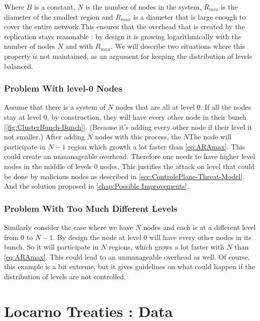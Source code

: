 \documentclass[a4paper,11pt,oneside]{report}
\begin{document}
Where $B$ is a constant, $N$ is the number of nodes in the system, $R_{min}$ is the diameter of the smallest region and $R_{max}$ is a diameter that is large enough to cover the entire network.This ensures that the overhead that is created by the replication stays reasonable : by design it is growing logarithmically with the number of nodes $N$ and with $R_{max}$. We will describe two situations where this property is not maintained, as an argument for keeping the distribution of levels balanced.

\subsection{Problem With level-0 Nodes} \label{app:levels-zero}
Assume that there is a system of $N$ nodes that are all at level 0. If all
the nodes stay at level 0, by construction, they will have every other node in
their bunch [\autoref{fig:ClusterBunch-Bunch}]. (Because it’s adding every other node if their level it not
smaller.) After adding $N$ nodes with this process, the $N$The node will participate
in $N-1$ region which growth a lot faster than \autoref{eq:ARAmax}. This could create an unmanageable overhead. Therefore one needs to have higher level nodes in the middle of levels 0 nodes. This justifies the attack on level that could be done by malicious nodes as described in \autoref{sec:ControlePlane-Threat-Model}. And the solution proposed in \autoref{chap:Possible Improvements}.

\subsection{Problem With Too Much Different Levels}
Similarly consider the case where we have $N$ nodes and each is at a different level from $0$ to $N-1$. By design the node at level $0$ will have every other nodes in its bunch. So it will participate in $N$ regions, which grows a lot faster with $N$ than \autoref{eq:ARAmax}. This could lead to  an unmanageable overhead as well. Of course, this example is a bit extreme, but it gives guidelines on what could happen if the distribution of levels are not controlled.

\chapter{Locarno Treaties : Data} \label{app:LocarnoTreaties-data}
\end{document}
